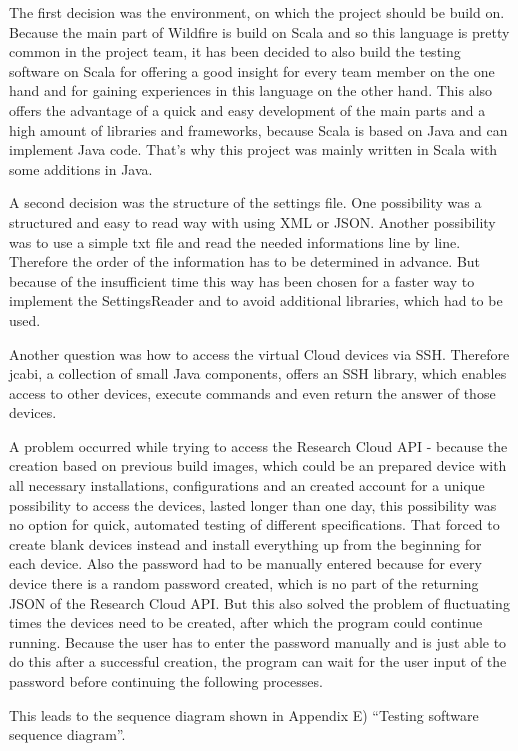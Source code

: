The first decision was the environment, on which the project should be build on. Because the main part of Wildfire is build on Scala and so this language is pretty common in the project team, it has been decided to also build the testing software on Scala for offering a good insight for every team member on the one hand and for gaining experiences in this language on the other hand. This also offers the advantage of a quick and easy development of the main parts and a high amount of libraries and frameworks, because Scala is based on Java and can implement Java code. That's why this project was mainly written in Scala with some additions in Java.

A second decision was the structure of the settings file. One possibility was a structured and easy to read way with using XML or JSON. Another possibility was to use a simple txt file and read the needed informations line by line. Therefore the order of the information has to be determined in advance. But because of the insufficient time this way has been chosen for a faster way to implement the SettingsReader and to avoid additional libraries, which had to be used.

Another question was how to access the virtual Cloud devices via SSH. Therefore jcabi, a collection of small Java components, offers an SSH library, which enables access to other devices, execute commands and even return the answer of those devices.

A problem occurred while trying to access the Research Cloud API - because the creation based on previous build images, which could be an prepared device with all necessary installations, configurations and an created account for a unique possibility to access the devices, lasted longer than one day, this possibility was no option for quick, automated testing of different specifications. That forced to create blank devices instead and install everything up from the beginning for each device. Also the password had to be manually entered because for every device there is a random password created, which is no part of the returning JSON of the Research Cloud API. But this also solved the problem of fluctuating times the devices need to be created, after which the program could continue running. Because the user has to enter the password manually and is just able to do this after a successful creation, the program can wait for the user input of the password before continuing the following processes.

This leads to the sequence diagram shown in Appendix E) ``Testing software sequence diagram''.

